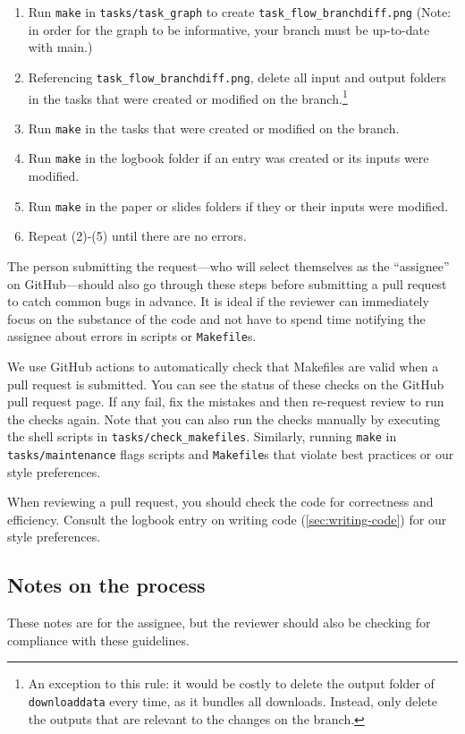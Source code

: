 \begin{enumerate}
\item Run \texttt{make} in \texttt{tasks/task\_graph} to create \texttt{task\_flow\_branchdiff.png}
    (Note: in order for the graph to be informative, your branch must be up-to-date with main.)
\item Referencing \texttt{task\_flow\_branchdiff.png},
    delete all input and output folders in the tasks that were created or
    modified on the branch.\footnote{An exception to this rule:
    it would be costly to delete the output folder of \texttt{downloaddata} every time,
    as it bundles all downloads. Instead, only delete the outputs that are relevant to the changes
    on the branch.}
\item Run \texttt{make} in the tasks that were created or modified on the branch.
\item Run \texttt{make} in the logbook folder if an entry was created or its inputs were modified.
\item Run \texttt{make} in the paper or slides folders if they or their inputs were modified.
\item Repeat (2)-(5) until there are no errors.
\end{enumerate}

The person submitting the request---who
will select themselves as the ``assignee'' on GitHub---should
also go through these steps before submitting a pull request
to catch common bugs in advance.
It is ideal if the reviewer can immediately focus on the substance of the code
and not have to spend time notifying the assignee about errors in scripts or \texttt{Makefile}s.

We use GitHub actions to automatically check
that Makefiles are valid when a pull request is submitted.
You can see the status of these checks on the GitHub pull request page.
If any fail,
fix the mistakes and then re-request review to run the checks again.
Note that you can also run the checks manually by executing the shell
scripts in \texttt{tasks/check\_makefiles}.
Similarly, running \texttt{make} in \texttt{tasks/maintenance} flags scripts and \texttt{Makefile}s that
violate best practices or our style preferences.

When reviewing a pull request,
you should check the code for correctness and efficiency.
Consult the logbook entry on writing code (\ref{sec:writing-code}) for our style preferences.

\subsection{Notes on the process}
These notes are for the assignee,
but the reviewer should also be checking for compliance with these guidelines.

